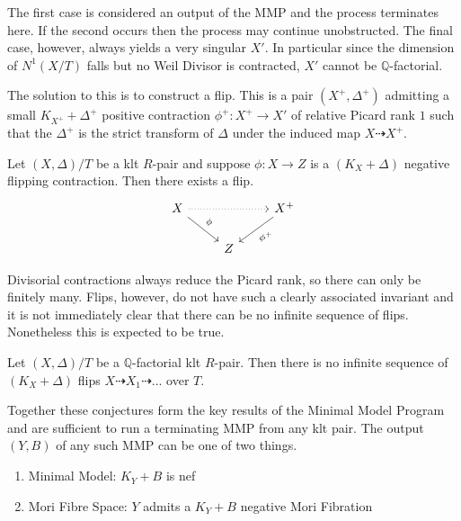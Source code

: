 The first case is considered an output of the MMP and the process terminates here. If the second occurs then the process may continue unobstructed. The final case, however, always yields a very singular $X'$. In particular since the dimension of $N^{1}(X/T)$ falls but no Weil Divisor is contracted, $X'$ cannot be $\mathbb{Q}$-factorial.

The solution to this is to construct a flip. This is a pair $(X^{+},\Delta^{+})$ admitting a small $K_{X^{+}} +\Delta^{+}$ positive contraction $\phi^{+}:X^{+} \to X'$ of relative Picard rank $1$ such that the $\Delta ^{+}$ is the strict transform of $\Delta$ under the induced map $X \dashrightarrow X^{+}$.

\begin{conjecture}\label{flips-conj}
	Let $(X,\Delta)/T$ be a klt $R$-pair and suppose $\phi\colon X \to Z$ is a $(K_{X}+\Delta)$ negative flipping contraction. Then there exists a flip. \[\begin{tikzcd}
	X \arrow[rr, dotted] \arrow[rd, "\phi"] &   & X^{+} \arrow[ld, "\phi^{+}"] \\
	& Z &                             
	\end{tikzcd}\]	
\end{conjecture}

Divisorial contractions always reduce the Picard rank, so there can only be finitely many. Flips, however, do not have such a clearly associated invariant and it is not immediately clear that there can be no infinite sequence of flips. Nonetheless this is expected to be true.

\begin{conjecture}
	
	Let $(X,\Delta)/T$ be a $\mathbb{Q}$-factorial klt $R$-pair. Then there is no infinite sequence of $(K_{X}+\Delta)$ flips $X \dashrightarrow X_{1} \dashrightarrow ...$ over $T$.
	
	\end{conjecture}

Together these conjectures form the key results of the Minimal Model Program and are sufficient to run a terminating MMP from any klt pair. The output $(Y,B)$ of any such MMP can be one of two things.

\begin{enumerate}
	\item Minimal Model: $K_{Y}+B$ is nef
	\item Mori Fibre Space: $Y$ admits a $K_{Y}+B$ negative Mori Fibration
\end{enumerate}

